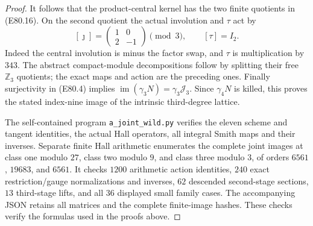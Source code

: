 \begin{proof}
It follows that the product-central kernel has
the two finite quotients in (E80.16). On the
second quotient the actual involution and
$\tau$ act by
\[
       [\jmath]=\begin{pmatrix}1&0\\2&-1\end{pmatrix}
                        \pmod3,
       \qquad [\tau]=I_2.
 \tag{E80.27}
\]
Indeed the central involution is minus the factor
swap, and $\tau$ is multiplication by $343$.
The abstract compact-module decompositions follow
by splitting their free $\mathbb Z_3$ quotients;
the exact maps and action are the preceding ones.
Finally surjectivity in (E80.4) implies
$\operatorname{im}(\gamma_3N)=\gamma_3\mathcal J_3$.
Since $\gamma_4N$ is killed, this proves the
stated index-nine image of the intrinsic
third-degree lattice.

The self-contained program
\texttt{a\_joint\_wild.py} verifies the eleven
scheme and tangent identities, the actual Hall
operators, all integral Smith maps and their
inverses. Separate finite Hall arithmetic
enumerates the complete joint images at class
one modulo $27$, class two modulo $9$, and class
three modulo $3$, of orders $6561$, $19683$,
and $6561$. It checks $1200$ arithmetic action
identities, $240$ exact restriction/gauge
normalizations and inverses, $62$ descended
second-stage sections, $13$ third-stage lifts,
and all $36$ displayed small family cases.
The accompanying JSON retains all matrices and
the complete finite-image hashes. These checks
verify the formulas used in the proofs above.
\end{proof}

